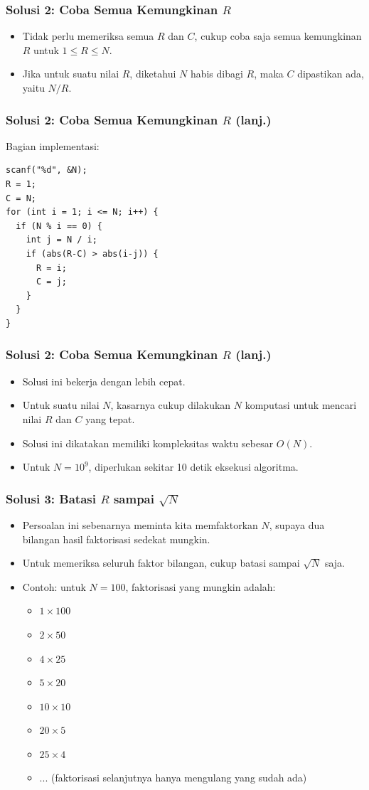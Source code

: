 \begin{frame}
\frametitle{Solusi 2: Coba Semua Kemungkinan $R$}
\begin{itemize}
  \item Tidak perlu memeriksa semua $R$ dan $C$, cukup coba saja semua kemungkinan $R$ untuk $1 \le R \le N$.
  \item Jika untuk suatu nilai $R$, diketahui $N$ habis dibagi $R$, maka $C$ dipastikan ada, yaitu $N/R$.
\end{itemize}
\end{frame}

\begin{frame}[fragile]
\frametitle{Solusi 2: Coba Semua Kemungkinan $R$ (lanj.)}
Bagian implementasi:
\begin{lstlisting}
scanf("%d", &N);
R = 1;
C = N;
for (int i = 1; i <= N; i++) {
  if (N % i == 0) {
    int j = N / i;
    if (abs(R-C) > abs(i-j)) {
      R = i;
      C = j;
    }
  }
}
\end{lstlisting}
\end{frame}

\begin{frame}[fragile]
\frametitle{Solusi 2: Coba Semua Kemungkinan $R$ (lanj.)}
\begin{itemize}
  \item Solusi ini bekerja dengan lebih cepat.
  \item Untuk suatu nilai $N$, kasarnya cukup dilakukan $N$ komputasi untuk mencari nilai $R$ dan $C$ yang tepat.
  \item Solusi ini dikatakan memiliki kompleksitas waktu sebesar $O(N)$.
  \item Untuk $N = 10^9$, diperlukan sekitar 10 detik eksekusi algoritma.
\end{itemize}
\end{frame}

\begin{frame}[fragile]
\frametitle{Solusi 3: Batasi $R$ sampai $\sqrt{N}$}
\begin{itemize}
  \item Persoalan ini sebenarnya meminta kita memfaktorkan $N$, supaya dua bilangan hasil faktorisasi sedekat mungkin.
  \item Untuk memeriksa seluruh faktor bilangan, cukup batasi sampai $\sqrt{N}$ saja.
  \item Contoh: untuk $N = 100$, faktorisasi yang mungkin adalah:
  \begin{itemize}
    \item $1 \times 100$
    \item $2 \times 50$
    \item $4 \times 25$
    \item $5 \times 20$
    \item $10 \times 10$
    \item $20 \times 5$
    \item $25 \times 4$
    \item $...$ (faktorisasi selanjutnya hanya mengulang yang sudah ada)
  \end{itemize}
\end{itemize}
\end{frame}

